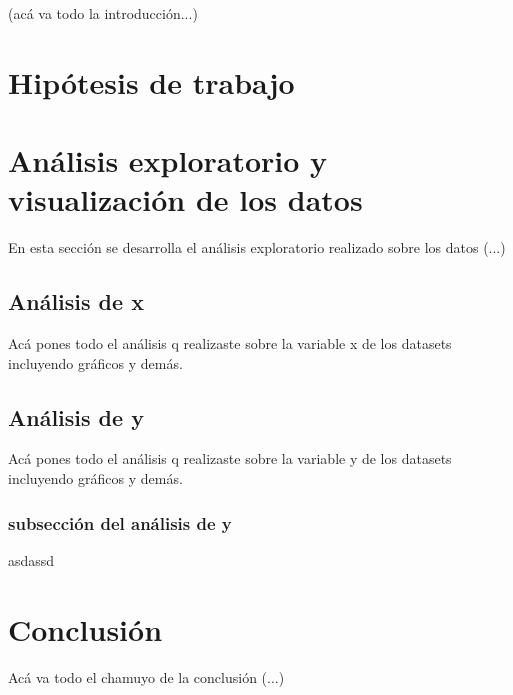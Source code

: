 \documentclass[titlepage,a4paper]{article}
\begin{document}
(acá va todo la introducción...)

\newpage

\section{Hipótesis de trabajo}\label{sec:intro}



\section{Análisis exploratorio y visualización de los datos}\label{sec:intro}

En esta sección se desarrolla el análisis exploratorio realizado sobre los datos (...)

\newpage  %

\subsection{Análisis de x}

Acá pones todo el análisis q realizaste sobre la variable x de los datasets incluyendo gráficos y demás.

\newpage 

\subsection{Análisis de y}

Acá pones todo el análisis q realizaste sobre la variable y de los datasets incluyendo gráficos y demás.

\subsubsection{subsección del análisis de y}

asdassd

\newpage  %

\section{Conclusión}\label{sec:intro}

Acá va todo el chamuyo de la conclusión (...)
\end{document}
